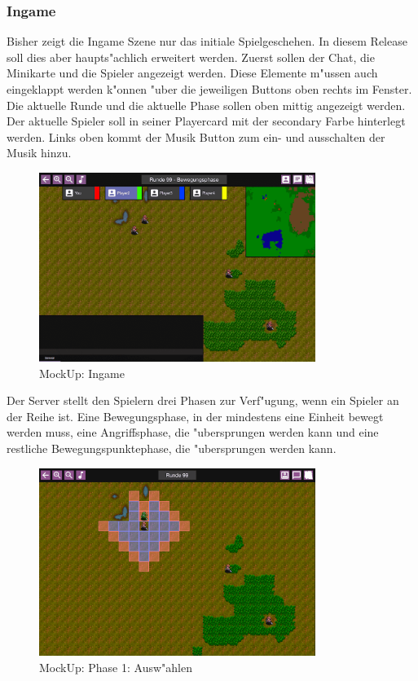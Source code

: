 \documentclass[12pt, titlepage]{scrartcl}
\newcounter{subsubsubsection}[subsubsection]
\begin{document}
		    \subsubsection{Ingame}
		        Bisher zeigt die Ingame Szene nur das initiale Spielgeschehen. In diesem Release soll dies aber haupts"achlich erweitert werden. Zuerst sollen der Chat, die Minikarte und die Spieler angezeigt werden. Diese Elemente m"ussen auch eingeklappt werden k"onnen "uber die jeweiligen Buttons oben rechts im Fenster. Die aktuelle Runde und die aktuelle Phase sollen oben mittig angezeigt werden. Der aktuelle Spieler soll in seiner Playercard mit der secondary Farbe hinterlegt werden. Links oben kommt der Musik Button zum ein- und ausschalten der Musik hinzu. \\
		        \begin{figure}[H] 
    				\centering
    				\includegraphics[width=0.8\textwidth]{images/mockUps/Ingame.png}
    				\caption{MockUp: Ingame}
    				\label{Ingame_View}
			    \end{figure}
			        Der Server stellt den Spielern drei Phasen zur Verf"ugung, wenn ein Spieler an der Reihe ist. Eine Bewegungsphase, in der mindestens eine Einheit bewegt werden muss, eine Angriffsphase, die "ubersprungen werden kann und eine restliche Bewegungspunktephase, die "ubersprungen werden kann. \\
			        \begin{figure}[H] 
    				    \centering
    				    \includegraphics[width=0.8\textwidth]{images/mockUps/Move2.png}
    				    \caption{MockUp: Phase 1: Ausw"ahlen}
    				    \label{Select_1}
			        \end{figure}
\end{document}
